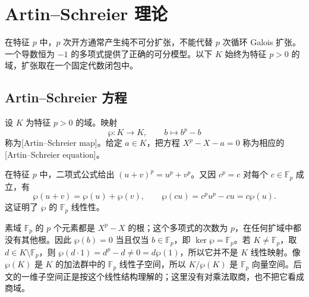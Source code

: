 
\section{Artin–Schreier 理论}
\label{b1:sec:2004}

在特征 \(p\) 中，\(p\) 次开方通常产生纯不可分扩张，不能代替 \(p\) 次循环 Galois 扩张。一个导数恒为 \(-1\) 的多项式提供了正确的可分模型。以下 \(K\) 始终为特征 \(p>0\) 的域，扩张取在一个固定代数闭包中。

%
%
%

\subsection{Artin–Schreier 方程}
\label{b1:subsec:2004:01}

\begin{definition}\label{b1:def:artin-schreier-map}
	设 \(K\) 为特征 \(p>0\) 的域。映射
	\[
		\wp:K\longrightarrow K,\qquad b\longmapsto b^p-b
	\]
	称为[Artin--Schreier map]。给定 \(a\in K\)，把方程 \(X^p-X-a=0\) 称为相应的[Artin--Schreier equation]。
\end{definition}

在特征 \(p\) 中，二项式公式给出 \((u+v)^p=u^p+v^p\)。又因 \(c^p=c\) 对每个 \(c\in\mathbb F_p\) 成立，有
\[
	\wp(u+v)=\wp(u)+\wp(v),\qquad \wp(cu)=c^pu^p-cu=c\wp(u).
\]
这证明了 \(\wp\) 的 \(\mathbb F_p\) 线性性。

\ProseParagraphBreak
素域 \(\mathbb F_p\) 的 \(p\) 个元素都是 \(X^p-X\) 的根；这个多项式的次数为 \(p\)，在任何扩域中都没有其他根。因此 \(\wp(b)=0\) 当且仅当 \(b\in\mathbb F_p\)，即 \(\ker\wp=\mathbb F_p\)。若 \(K\neq\mathbb F_p\)，取 \(d\in K\setminus\mathbb F_p\)，则 \(\wp(d\cdot1)=d^p-d\neq0=d\wp(1)\)，所以它并不是 \(K\) 线性映射。像 \(\wp(K)\) 是 \(K\) 的加法群中的 \(\mathbb F_p\) 线性子空间，所以 \(K/\wp(K)\) 是 \(\mathbb F_p\) 向量空间。后文的一维子空间正是按这个线性结构理解的；这里没有对乘法取商，也不把它看成商域。

